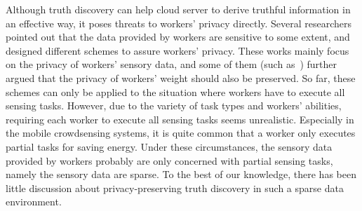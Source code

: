 \documentclass[conference]{IEEEtran}
\begin{document}
Although truth discovery can help cloud server to derive truthful information in an effective way, it poses threats to workers' privacy directly.
Several researchers~\cite{miao_cloud-enabled_2015,xu_efficient_2019,miao_lightweight_2017,zhang_reliable_2019,xue_inpptd_2020} pointed out that the data provided by workers are sensitive to some extent, and designed different schemes to assure workers' privacy.
These works mainly focus on the privacy of workers' sensory data, and some of them (such as~\cite{zhang_reliable_2019,xue_inpptd_2020}) further argued that the privacy of workers' weight should also be preserved.
So far, these schemes can only be applied to the situation where workers have to execute all sensing tasks.
However, due to the variety of task types and workers' abilities, requiring each worker to execute all sensing tasks seems unrealistic.
Especially in the mobile crowdsensing systems, it is quite common that a worker only executes partial tasks for saving energy.
Under these circumstances, the sensory data provided by workers probably are only concerned with partial sensing tasks, namely the sensory data are sparse.
To the best of our knowledge, there has been little discussion about privacy-preserving truth discovery in such a sparse data environment.
\end{document}
